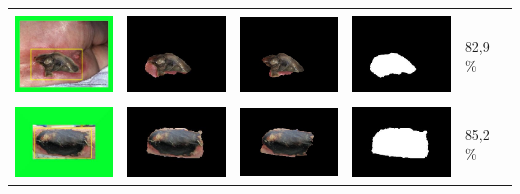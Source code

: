 \begin{table}[H]
\begin{tabular}{|m{1.1in}|m{1.1in}|m{1.1in}|m{1.1in}|m{0.7in}|}
		&  &  & \\
		\includegraphics[width=1.1in]{gambar/hasil_segmentasi/luka_hitam/image_20_rect.jpg} \fontsize{8}{12}{(51, 107, 168, 101)}&
		\includegraphics[width=1.1in]{gambar/hasil_segmentasi/luka_hitam/result_20.jpg}&
		\includegraphics[width=1.1in]{gambar/hasil_segmentasi/luka_hitam/result_20_cv.jpg}&
		\includegraphics[width=1.1in]{gambar/hasil_segmentasi/luka_hitam/mask_20.jpg}&
		82,9 \% \\
		\hline
		
		&  &  & \\
		\includegraphics[width=1.1in]{gambar/hasil_segmentasi/luka_hitam/image_22_rect.jpg} \fontsize{8}{12}{(63, 67, 186, 98)}&
		\includegraphics[width=1.1in]{gambar/hasil_segmentasi/luka_hitam/result_22.jpg}&
		\includegraphics[width=1.1in]{gambar/hasil_segmentasi/luka_hitam/result_22_cv.jpg}&
		\includegraphics[width=1.1in]{gambar/hasil_segmentasi/luka_hitam/mask_22.jpg}&
		85,2 \% \\
		\hline
		
	\end{tabular}
\end{table}